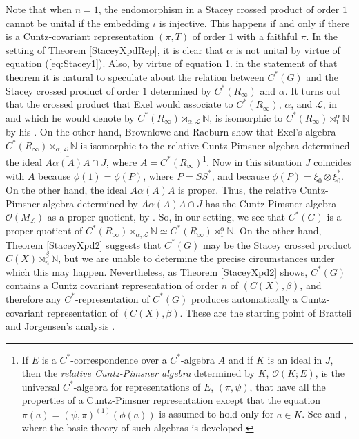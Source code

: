 \documentclass{amsproc}
\theoremstyle{plain}
\theoremstyle{definition}
\theoremstyle{definition}
\theoremstyle{remark}
\theoremstyle{plain}
\begin{document}
Note that when $n=1$, the endomorphism in a Stacey crossed product
of order $1$ cannot be unital if the embedding $\iota$ is injective.
This happens if and only if there is a Cuntz-covariant representation
$(\pi,T)$ of order $1$ with a faithful $\pi$.$ $ In the setting
of Theorem \ref{StaceyXpdRep}, it is clear that $\alpha$ is not
unital by virtue of equation (\ref{eq:Stacey1}). Also, by virtue
of equation 1. in the statement of that theorem it is natural to speculate
about the relation between $C^{*}(G)$ and the Stacey crossed product
of order $1$ determined by $C^{*}(R_{\infty})$ and $\alpha$. It
turns out that the crossed product that Exel would associate to
$C^{*}(R_{\infty})$,
$\alpha$, and $\mathcal{L}$, in \cite{rE03} and which he would
denote by $C^{*}(R_{\infty})\rtimes_{\alpha,\mathcal{L}}\mathbb{N}$,
is isomorphic to $C^{*}(R_{\infty})\rtimes_{1}^{\alpha}\mathbb{N}$
by his \cite[Theorem 4.7]{rE03}. On the other hand, Brownlowe and
Raeburn show that Exel's algebra
$C^{*}(R_{\infty})\rtimes_{\alpha,\mathcal{L}}\mathbb{N}$
is isomorphic to the relative Cuntz-Pimsner algebra determined the
ideal $\overline{A\alpha(A)A}\cap J$, where $A=C^{*}(R_{\infty})$\footnote{If $E$ is a $C^{*}$-correspondence over a $C^{*}$-algebra $A$
and if $K$ is an ideal in $J$, then the \emph{relative Cuntz-Pimsner
algebra} determined by $K$, $\mathcal{O}(K;E)$, is the universal
$C^{*}$-algebra for representations of $E$, $(\pi,\psi)$, that
have all the properties of a Cuntz-Pimsner representation except that
the equation $\pi(a)=(\psi,\pi)^{(1)}(\phi(a))$ is assumed to hold
only for $a\in K$. See \cite{MS98} and \cite{FMR03}, where the
basic theory of such algebras is developed.}. Now in this situation $J$ coincides with $A$ because $\phi(1)=\phi(P)$,
where $P=SS^{*}$, and because $\phi(P)=\xi_{0}\otimes\xi_{0}^{*}$.
On the other hand, the ideal $\overline{A\alpha(A)A}$ is proper.
Thus, the relative Cuntz-Pimsner algebra determined by
$\overline{A\alpha(A)A}\cap J$
has the Cuntz-Pimsner algebra $\mathcal{O}(M_{\mathcal{L}})$ as a
proper quotient, by \cite[Proposition 3.14]{FMR03}. So, in our setting,
we see that $C^{*}(G)$ is a proper quotient of
$C^{*}(R_{\infty})\rtimes_{\alpha,\mathcal{L}}\mathbb{N}\simeq
C^{*}(R_{\infty})\rtimes_{1}^{\alpha}\mathbb{N}$.
On the other hand, Theorem \ref{StaceyXpd2} suggests that $C^{*}(G)$
may be the Stacey crossed product $C(X)\rtimes_{n}^{\beta}\mathbb{N}$,
but we are unable to determine the precise circumstances under which
this may happen. Nevertheless, as Theorem \ref{StaceyXpd2} shows,
$C^{*}(G)$ contains a Cuntz covariant representation of order $n$
of $(C(X),\beta)$, and therefore any $C^{*}$-representation of $C^{*}(G)$
produces automatically a Cuntz-covariant representation of $(C(X),\beta)$.
These are the starting point of Bratteli and Jorgensen's analysis
\cite[Proposition 1.1]{BJ97}. 
\end{document}
